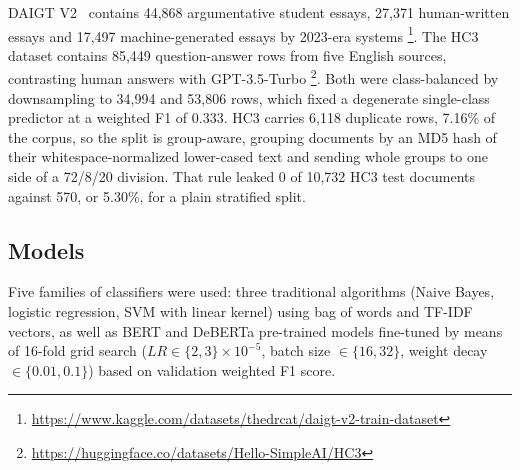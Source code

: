 \documentclass[conference,a4paper]{IEEEtran}
\newcommand{\secref}[1]{\hyperref[#1]{\ref*{#1}}}
\begin{document}
DAIGT V2~\cite{Thedrcat2023daigtv2} contains 44,868 argumentative student essays, 27,371 human-written essays and 17,497 machine-generated essays by 2023-era systems \footnote{\url{https://www.kaggle.com/datasets/thedrcat/daigt-v2-train-dataset}}. The HC3~\cite{Guo2023close} dataset contains 85,449 question-answer rows from five English sources, contrasting human answers with GPT-3.5-Turbo \footnote{\url{https://huggingface.co/datasets/Hello-SimpleAI/HC3}}. %
Both were class-balanced by downsampling to 34,994 and 53,806 rows, which fixed a degenerate single-class predictor at a weighted F1 of 0.333. HC3 carries 6,118 duplicate rows, 7.16\% of the corpus, so the split is group-aware, grouping documents by an MD5 hash of their whitespace-normalized lower-cased text and sending whole groups to one side of a 72/8/20 division. That rule leaked 0 of 10,732 HC3 test documents against 570, or 5.30\%, for a plain stratified split.

\subsection{Models}
Five families of classifiers were used: three traditional algorithms (Naive Bayes, logistic regression, SVM with linear kernel) using bag of words and TF-IDF vectors, as well as BERT and DeBERTa pre-trained models fine-tuned by means of 16-fold grid search ($LR \in \{2,3\} \times 10^{-5}$, batch size $\in \{16,32\}$, weight decay $\in \{0.01, 0.1\}$) based on validation weighted F1 score.

\end{document}
